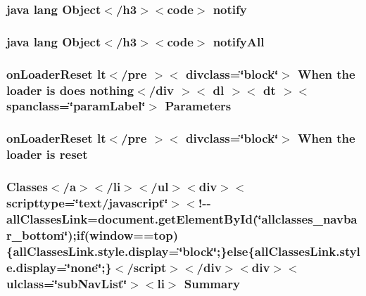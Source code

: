 \hypertarget{_login_activity_8html_ae99ae10b5010594dbda4794e02db271b}{
\subsubsection[{notify}]{\setlength{\rightskip}{0pt plus 5cm}java lang Object$<$/h3$>$$<$code$>$ notify}}\label{_login_activity_8html_ae99ae10b5010594dbda4794e02db271b}
\hypertarget{_login_activity_8html_a1279357e6e09e33e75b55eb05fdb6436}{
\subsubsection[{notify\-All}]{\setlength{\rightskip}{0pt plus 5cm}java lang Object$<$/h3$>$$<$code$>$ notify\-All}}\label{_login_activity_8html_a1279357e6e09e33e75b55eb05fdb6436}
\hypertarget{_login_activity_8html_a783927629214f949d42e3ef5da78fcc1}{
\subsubsection[{Parameters}]{\setlength{\rightskip}{0pt plus 5cm}on\-Loader\-Reset {\bf lt}$<$/pre $>$$<$ divclass=\char`\"{}block\char`\"{}$>$ When the loader is does nothing$<$/div $>$$<$ dl $>$$<$ {\bf dt} $>$$<$ spanclass=\char`\"{}param\-Label\char`\"{}$>$ Parameters}}\label{_login_activity_8html_a783927629214f949d42e3ef5da78fcc1}
\hypertarget{_login_activity_8html_abd713df3bde238b4087ddfd70693359a}{
\subsubsection[{reset}]{\setlength{\rightskip}{0pt plus 5cm}on\-Loader\-Reset {\bf lt}$<$/pre $>$$<$ divclass=\char`\"{}block\char`\"{}$>$ When the loader is reset}}\label{_login_activity_8html_abd713df3bde238b4087ddfd70693359a}
\hypertarget{_login_activity_8html_a6f9ab45abc9b0679dc1b132fbacfc681}{
\subsubsection[{Summary}]{\setlength{\rightskip}{0pt plus 5cm}Classes$<$/{\bf a}$>$$<$/li$>$$<$/ul$>$$<$div$>$$<$scripttype=\char`\"{}text/javascript\char`\"{}$>$$<$!-\/-\/all\-Classes\-Link=document.\-get\-Element\-By\-Id(\char`\"{}allclasses\-\_\-navbar\-\_\-bottom\char`\"{});if(window==top)\{all\-Classes\-Link.\-style.\-display=\char`\"{}block\char`\"{};\}else\{all\-Classes\-Link.\-style.\-display=\char`\"{}none\char`\"{};\}$<$/script$>$$<$/div$>$$<$div$>$$<$ulclass=\char`\"{}sub\-Nav\-List\char`\"{}$>$$<$li$>$ Summary}}\label{_login_activity_8html_a6f9ab45abc9b0679dc1b132fbacfc681}
